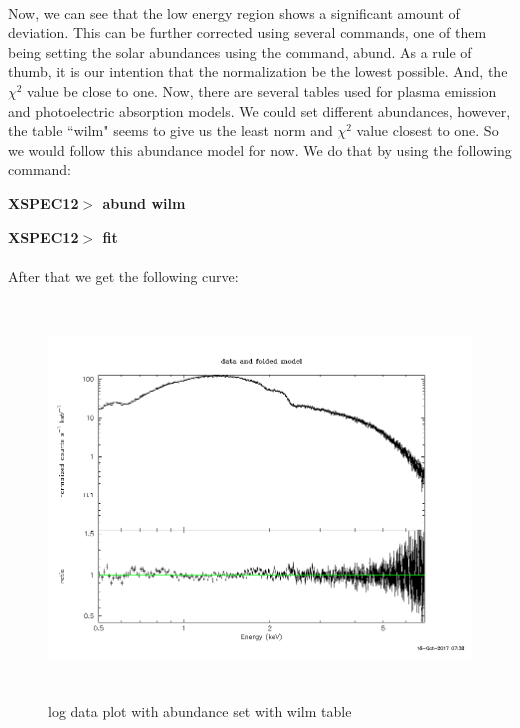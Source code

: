 \documentclass[a4paper,twoside]{report}
\numberwithin{equation}{section}
\begin{document}
\paragraph{}
Now, we can see that the low energy region shows a significant amount of deviation. This can be further corrected using several commands, one of them being setting the solar abundances using the command, abund. As a rule of thumb, it is our intention that the normalization be the lowest possible. And, the $\chi ^2$ value be close to one. Now, there are several tables used for plasma emission and photoelectric absorption models. We could set different abundances, however, the table ``wilm" seems to give us the least norm and $\chi ^2$ value closest to one. So we would follow this abundance model for now. We do that by using the following command:
\begin{center}
\item \large \textbf{XSPEC12$>$ abund wilm}
\item \large \textbf{XSPEC12$>$ fit}
\end{center}
\paragraph{}
After that we get the following curve:
\begin{figure}[h]
\includegraphics[width=1.0\linewidth, height=10.5cm]{8.jpg}
\caption{log data plot with abundance set with wilm table}
\label{log_dp_abund}
\end{figure}
\end{document}
